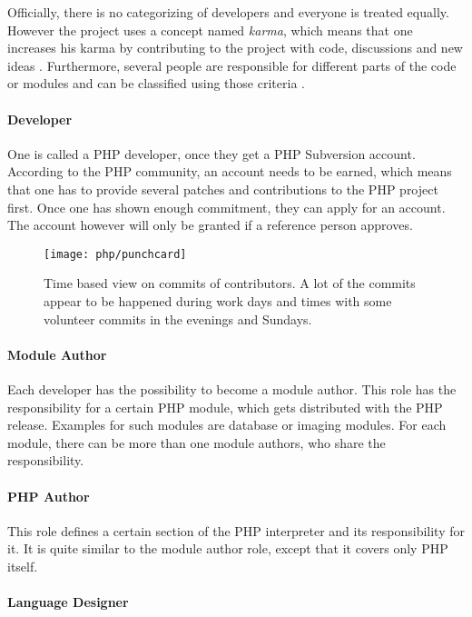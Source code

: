 Officially, there is no categorizing of developers and everyone is treated
equally. However the project uses a concept named \emph{karma}, which means
that one increases his karma by contributing to the project with code,
discussions and new ideas \cite{Magnusson2010}. Furthermore, several people are
responsible for different parts of the code or modules and can be classified
using those criteria \cite{PHPCredits}.

\paragraph{Developer}

One is called a PHP developer, once they get a PHP Subversion account.
According to the PHP community, an account needs to be earned, which means that
one has to provide several patches and contributions to the PHP project first.
Once one has shown enough commitment, they can apply for an account. The
account however will only be granted if a reference person approves.

\begin{figure}[htbp]
  \centering
  \texttt{[image: php/punchcard]}
  \caption[Time Based View on Commits, PHP]
  {Time based view on commits of contributors. A lot of the commits appear to
    be happened during work days and times with some volunteer commits in the
    evenings and Sundays.}
  \label{fig:php:p}
\end{figure}

\paragraph{Module Author}

Each developer has the possibility to become a module author. This role has the
responsibility for a certain PHP module, which gets distributed with the PHP
release. Examples for such modules are database or imaging modules. For each
module, there can be more than one module authors, who share the
responsibility.

\paragraph{PHP Author}

This role defines a certain section of the PHP interpreter and its
responsibility for it. It is quite similar to the module author role, except
that it covers only PHP itself.

\paragraph{Language Designer}

